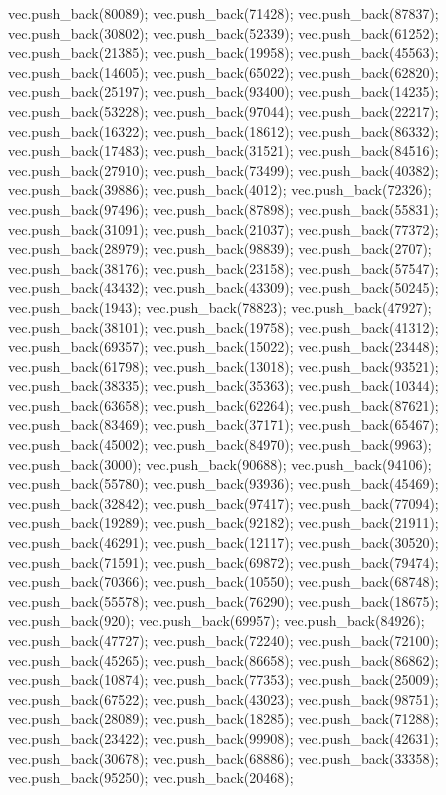 vec.push_back(80089);
vec.push_back(71428);
vec.push_back(87837);
vec.push_back(30802);
vec.push_back(52339);
vec.push_back(61252);
vec.push_back(21385);
vec.push_back(19958);
vec.push_back(45563);
vec.push_back(14605);
vec.push_back(65022);
vec.push_back(62820);
vec.push_back(25197);
vec.push_back(93400);
vec.push_back(14235);
vec.push_back(53228);
vec.push_back(97044);
vec.push_back(22217);
vec.push_back(16322);
vec.push_back(18612);
vec.push_back(86332);
vec.push_back(17483);
vec.push_back(31521);
vec.push_back(84516);
vec.push_back(27910);
vec.push_back(73499);
vec.push_back(40382);
vec.push_back(39886);
vec.push_back(4012);
vec.push_back(72326);
vec.push_back(97496);
vec.push_back(87898);
vec.push_back(55831);
vec.push_back(31091);
vec.push_back(21037);
vec.push_back(77372);
vec.push_back(28979);
vec.push_back(98839);
vec.push_back(2707);
vec.push_back(38176);
vec.push_back(23158);
vec.push_back(57547);
vec.push_back(43432);
vec.push_back(43309);
vec.push_back(50245);
vec.push_back(1943);
vec.push_back(78823);
vec.push_back(47927);
vec.push_back(38101);
vec.push_back(19758);
vec.push_back(41312);
vec.push_back(69357);
vec.push_back(15022);
vec.push_back(23448);
vec.push_back(61798);
vec.push_back(13018);
vec.push_back(93521);
vec.push_back(38335);
vec.push_back(35363);
vec.push_back(10344);
vec.push_back(63658);
vec.push_back(62264);
vec.push_back(87621);
vec.push_back(83469);
vec.push_back(37171);
vec.push_back(65467);
vec.push_back(45002);
vec.push_back(84970);
vec.push_back(9963);
vec.push_back(3000);
vec.push_back(90688);
vec.push_back(94106);
vec.push_back(55780);
vec.push_back(93936);
vec.push_back(45469);
vec.push_back(32842);
vec.push_back(97417);
vec.push_back(77094);
vec.push_back(19289);
vec.push_back(92182);
vec.push_back(21911);
vec.push_back(46291);
vec.push_back(12117);
vec.push_back(30520);
vec.push_back(71591);
vec.push_back(69872);
vec.push_back(79474);
vec.push_back(70366);
vec.push_back(10550);
vec.push_back(68748);
vec.push_back(55578);
vec.push_back(76290);
vec.push_back(18675);
vec.push_back(920);
vec.push_back(69957);
vec.push_back(84926);
vec.push_back(47727);
vec.push_back(72240);
vec.push_back(72100);
vec.push_back(45265);
vec.push_back(86658);
vec.push_back(86862);
vec.push_back(10874);
vec.push_back(77353);
vec.push_back(25009);
vec.push_back(67522);
vec.push_back(43023);
vec.push_back(98751);
vec.push_back(28089);
vec.push_back(18285);
vec.push_back(71288);
vec.push_back(23422);
vec.push_back(99908);
vec.push_back(42631);
vec.push_back(30678);
vec.push_back(68886);
vec.push_back(33358);
vec.push_back(95250);
vec.push_back(20468);
